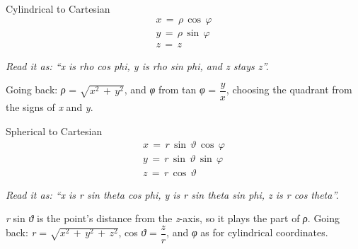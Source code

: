 \documentclass[11pt]{article}
\begin{document}
\begin{keepsection}
\begin{equationcard}{Cylindrical to Cartesian}
\[ \begin{gathered} {x}\, =\, {ρ}\, \cos \, {φ} \\ {y}\, =\, {ρ}\, \sin \, {φ} \\ {z}\, =\, {z} \end{gathered} \]
{\small \emph{Read it as: “x is rho cos phi, y is rho sin phi, and z stays z”.}\par Going back: \textit{ρ} = \ensuremath{\sqrt{{x}^{2}\, +\, {y}^{2}}}, and \textit{φ} from tan \textit{φ} = {\small\ensuremath{\dfrac{{y}}{{x}}}}, choosing the quadrant from the signs of \textit{x} and \textit{y}.}
\end{equationcard}

\begin{equationcard}{Spherical to Cartesian}
\[ \begin{gathered} {x}\, =\, {r}\, \sin \, {ϑ}\, \cos \, {φ} \\ {y}\, =\, {r}\, \sin \, {ϑ}\, \sin \, {φ} \\ {z}\, =\, {r}\, \cos \, {ϑ} \end{gathered} \]
{\small \emph{Read it as: “x is r sin theta cos phi, y is r sin theta sin phi, z is r cos theta”.}\par \textit{r} sin \textit{ϑ} is the point’s distance from the \textit{z}-axis, so it plays the part of \textit{ρ}. Going back: \textit{r} = \ensuremath{\sqrt{{x}^{2}\, +\, {y}^{2}\, +\, {z}^{2}}}, cos \textit{ϑ} = {\small\ensuremath{\dfrac{{z}}{{r}}}}, and \textit{φ} as for cylindrical coordinates.}
\end{equationcard}
\end{keepsection}
\end{document}
